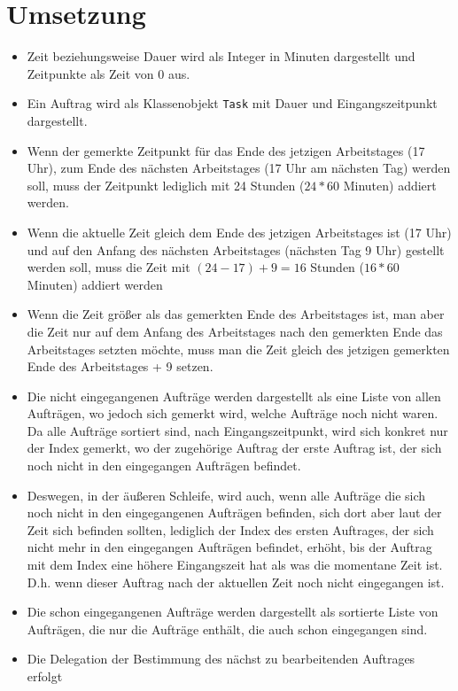 \documentclass[a4paper,10pt,ngerman]{scrartcl}
\begin{document}
\section{Umsetzung}\label{sec:umsetzung}
\begin{itemize}
	\item Zeit beziehungsweise Dauer wird als Integer in Minuten dargestellt und Zeitpunkte als Zeit von 0 aus.
	\item Ein Auftrag wird als Klassenobjekt \texttt{Task} mit Dauer und Eingangszeitpunkt dargestellt.
	\item Wenn der gemerkte Zeitpunkt für das Ende des jetzigen Arbeitstages (17 Uhr),
	zum Ende des nächsten Arbeitstages (17 Uhr am nächsten Tag)  werden soll,
	muss der Zeitpunkt lediglich mit 24 Stunden ($24 * 60$ Minuten) addiert werden.
	\item Wenn die aktuelle Zeit gleich dem Ende des jetzigen Arbeitstages ist (17 Uhr)
	und auf den Anfang des nächsten Arbeitstages (nächsten Tag 9 Uhr) gestellt werden soll,
	muss die Zeit mit $(24 - 17) + 9 = 16$ Stunden ($16 * 60$ Minuten) addiert werden 
	\item Wenn die Zeit größer als das gemerkten Ende des Arbeitstages ist,
	man aber die Zeit nur auf dem Anfang des Arbeitstages nach den gemerkten Ende das Arbeitstages setzten möchte,
	muss man die Zeit gleich des jetzigen gemerkten Ende des Arbeitstages + 9 setzen.
	\item Die nicht eingegangenen Aufträge werden dargestellt als eine Liste von allen Aufträgen,
	      wo jedoch sich gemerkt wird, welche Aufträge noch nicht waren.
	      Da alle Aufträge sortiert sind, nach Eingangszeitpunkt, wird sich konkret nur der Index gemerkt,
	      wo der zugehörige Auftrag der erste Auftrag ist, der sich noch nicht in den eingegangen Aufträgen befindet.
	\item Deswegen, in der äußeren Schleife, wird auch, wenn alle Aufträge die sich noch nicht
	      in den eingegangenen Aufträgen befinden, sich dort aber laut der Zeit sich befinden sollten,
	      lediglich der Index des ersten Auftrages, der sich nicht mehr in den eingegangen Aufträgen befindet,
	      erhöht, bis der Auftrag mit dem Index eine höhere Eingangszeit hat als was die momentane Zeit ist.
	      D.h. wenn dieser Auftrag nach der aktuellen Zeit noch nicht eingegangen ist.
	\item Die schon eingegangenen Aufträge werden dargestellt als sortierte Liste von Aufträgen,
	      die nur die Aufträge enthält, die auch schon eingegangen sind.
	\item Die Delegation der Bestimmung des nächst zu bearbeitenden Auftrages erfolgt

\end{itemize}
\end{document}
